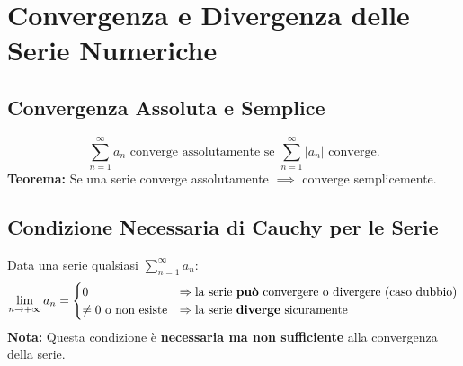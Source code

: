 \documentclass[10pt, a4paper]{article}
\begin{document}
\section{Convergenza e Divergenza delle Serie Numeriche}
    \subsection{Convergenza Assoluta e Semplice}
        \begin{equation*}
            \sum_{n=1}^{\infty}a_n \text{ converge assolutamente se } \sum_{n=1}^{\infty}\left|a_n\right| \text{ converge.}
        \end{equation*}
        \textbf{Teorema:} Se una serie converge assolutamente $\implies$ converge semplicemente.
    \subsection{Condizione Necessaria di Cauchy per le Serie}
        Data una serie qualsiasi $\sum_{n=1}^{\infty}a_n$:
        \begin{equation*}
            \lim_{n\rightarrow+\infty}a_n = \begin{cases}
                0 & \Rightarrow \text{la serie \textbf{può} convergere o divergere (caso dubbio)} \\
                \neq 0 \text{ o non esiste} & \Rightarrow \text{la serie \textbf{diverge} sicuramente}
            \end{cases}
        \end{equation*}
        \textbf{Nota:} Questa condizione è \textbf{necessaria ma non sufficiente} alla convergenza della serie.
    
    \newpage
\end{document}
